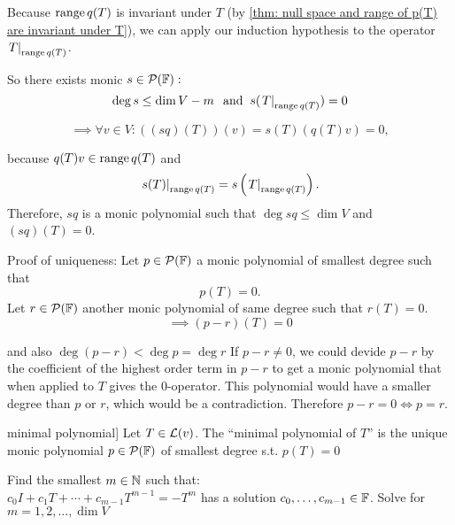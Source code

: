 \begin{prf}
  Because $\operatorname{range} q(T)$ is invariant under $T$ (by  \ref{thm: null space and range of p(T) are invariant under T}), we can apply our induction hypothesis to the operator $\left.T\right|_{\operatorname{range} q(T)}$. 
  
  So there exists monic $s \in \mathcal{P} (\mathbb{F}):$
  \begin{equation}
    \deg s \leq \dim V - m \;\;\, \text{and}\;\; s(\left.T\right|_{\operatorname{range} q(T)})=0
  \end{equation}
  
  \begin{equation}
    \implies \forall v \in V: \left((sq)(T)\right)(v) = s(T) (q(T)v) = 0, 
  \end{equation}
  
  because $q(T)v \in \operatorname{range} q(T)$ and \begin{equation}
    \left.s(T)\right|_{\operatorname{range} q(T)}=s\left( \left.T\right|_{\operatorname{range} q(T)} \right ).
  \end{equation}
  Therefore, $sq$ is a monic polynomial such that $\deg sq \leq \dim V$ and $(sq)(T)=0$.
  
  Proof of uniqueness: Let $p\in \mathcal{P} (\mathbb{F})$ a monic polynomial of smallest degree such that 
  \begin{equation}
    p(T)=0.
  \end{equation} Let $r\in \mathcal{P} ( \mathbb{F})$ another monic polynomial of same degree such that $r(T)=0.$ 
  \begin{equation}
    \implies (p-r) (T) = 0
  \end{equation} 
  
  and also $\deg (p-r) < \deg p = \deg r$ If $p-r \neq 0$, we could devide $p-r$ by the coefficient of the highest order term in $p-r$ to get a monic polynomial that when applied to $T$ gives the $0$-operator. This polynomial would have a smaller degree than $p$ or $r$, which would be a contradiction. Therefore $p-r=0 \iff p = r$.
\end{prf}

\setcounter{thm}{23}

\begin{mydef} minimal polynomial]
  Let $T\in \mathcal{L} (v)$. The ``minimal polynomial of $T$'' is the unique monic polynomial $p\in \mathcal{P}(\mathbb{F})$ of smallest degree s.t. $p(T)=0$
\end{mydef}
 Find the smallest $m \in \mathbb{N}$ such that: \\
$c_0I + c_1 T + \cdots + c_{m-1} T^{m-1} = -T^{m}$ has a solution $c_0, \dots, c_{m-1} \in \mathbb{F}$. Solve for $m=1,2,\dots,\dim V$

